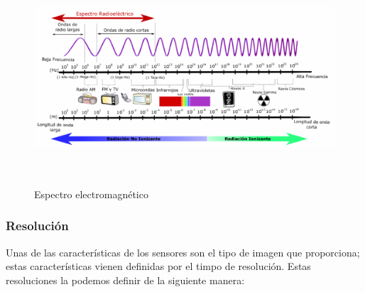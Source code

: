 \begin{figure}[H] \centering
  \includegraphics[height=8cm,keepaspectratio=true,clip=true]{imagenes/MarcoTeorico/espectro-electro.png}
  \caption{Espectro electromagnético}\label{Fig:espectro-electromagnetico}
\end{figure}


\subsubsection{Resolución}
Unas de las características de los sensores son el tipo de imagen que proporciona; estas características vienen definidas por el timpo de resolución. Estas resoluciones la podemos definir de la siguiente manera:

